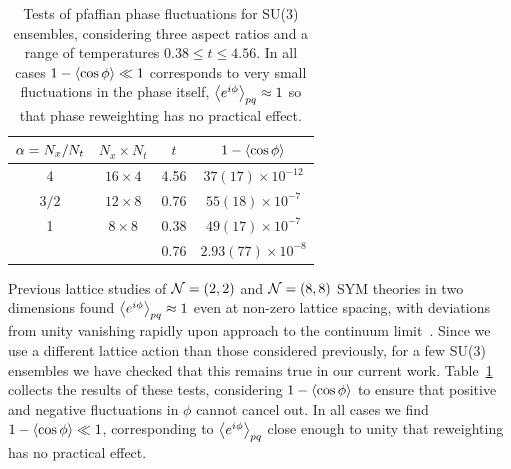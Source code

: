 \begin{table}[htbp]
  \centering
  \renewcommand\arraystretch{1.2}  
  \addtolength{\tabcolsep}{3 pt}    
  \begin{tabular}{c|c|c|c}
    \hline
    $\alpha = N_x / N_t$ & $N_x \times N_t$ & $t$  & $1 - \left\langle \cos\phi \right\rangle$     \\
    \hline
    4                 & $16\times 4$     & 4.56 & $37(17)\times 10^{-12}$  \\ 
    \hline
    $3 / 2$           & $12\times 8$     & 0.76 & $55(18)\times 10^{-7}$   \\ 
    \hline
    1                 & $8\times 8$      & 0.38 & $49(17)\times 10^{-7}$   \\ 
                      &                  & 0.76 & $2.93(77)\times 10^{-8}$ \\ 
    \hline
  \end{tabular}
  \caption{\label{tab:pfaffian}Tests of pfaffian phase fluctuations for SU(3) ensembles, considering three aspect ratios \al and a range of temperatures $0.38 \leq t \leq 4.56$.  In all cases $1 - \left\langle \cos\phi \right\rangle \ll 1$ corresponds to very small fluctuations in the phase itself, $\left\langle e^{i\phi} \right\rangle_{pq} \approx 1$ so that phase reweighting has no practical effect.}
\end{table}

Previous lattice studies of $\mathcal N = (2, 2)$ and $\mathcal N = (8, 8)$ SYM theories in two dimensions found $\left\langle e^{i\phi} \right\rangle_{pq} \approx 1$ even at non-zero lattice spacing, with deviations from unity vanishing rapidly upon approach to the continuum limit~\cite{Hanada:2010qg, Catterall:2011aa, Mehta:2011ud, Galvez:2012sv}.
Since we use a different lattice action than those considered previously, for a few SU(3) ensembles we have checked that this remains true in our current work.
Table~\ref{tab:pfaffian} collects the results of these tests, considering $1 - \left\langle \cos\phi \right\rangle$ to ensure that positive and negative fluctuations in $\phi$ cannot cancel out.
In all cases we find $1 - \left\langle \cos\phi \right\rangle \ll 1$, corresponding to $\left\langle e^{i\phi} \right\rangle_{pq}$ close enough to unity that reweighting has no practical effect.









